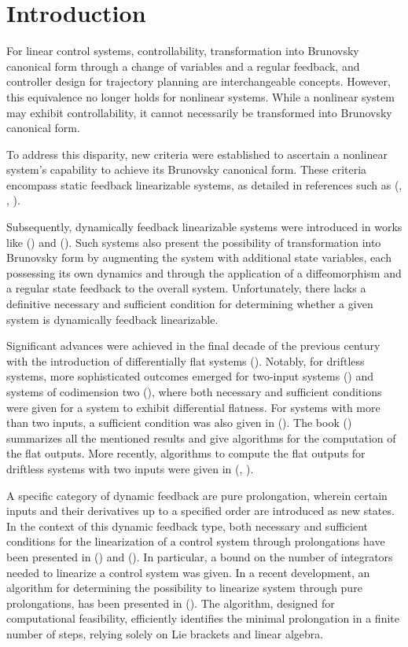 \documentclass[10pt]{article}
\newcommand{\3}{\mathbf{3}}
\newcommand{\2}{\mathbf{2}}
\newcommand{\1}{\mathbf{1}}
\newcommand{\0}{\mathbf{0}}
\begin{document}
\section{Introduction}
\label{introduction}

For linear control systems, controllability, transformation into Brunovsky canonical form through a change of variables and a regular feedback, and controller design for trajectory planning are interchangeable concepts. However, this equivalence no longer holds for nonlinear systems. While a nonlinear system may exhibit controllability, it cannot necessarily be transformed into Brunovsky canonical form.

To address this disparity, new criteria were established to ascertain a nonlinear system's capability to achieve its Brunovsky canonical form. These criteria encompass static feedback linearizable systems, as detailed in references such as (\cite{HSM}, \cite{JR}, \cite{Isidori}).

Subsequently,  dynamically feedback linearizable systems were introduced in works like (\cite{CLM89}) and (\cite{CLM91}).
Such systems also present the possibility of transformation into Brunovsky form by augmenting the system with additional state variables, each possessing its own dynamics and through the application of a diffeomorphism and a regular state feedback to the overall system.
Unfortunately, there lacks a definitive necessary and sufficient condition for determining whether a given system is dynamically feedback linearizable.

Significant advances were achieved in the final decade of the previous century with the introduction of differentially flat systems (\cite{FLMR1995}). Notably, for driftless systems, more sophisticated outcomes emerged for two-input systems (\cite{MR94}) and systems of codimension two (\cite{MR95}), where both necessary and sufficient conditions were given for a system to exhibit differential flatness. For systems with more than two inputs, a sufficient condition was also given in (\cite{MR94}). The book (\cite{Levine2009}) summarizes all the mentioned results and give algorithms for the computation of the flat outputs. More recently, algorithms to compute the flat outputs for driftless systems with two inputs were given in (\cite{LR}, \cite{Schoberl2023}).

A specific category of dynamic feedback are pure prolongation, wherein certain inputs and their derivatives up to a specified order are introduced as new states. In the context of this dynamic feedback type, both necessary and sufficient conditions for the linearization of a control system through prolongations have been presented in (\cite{tesi}) and (\cite{EJC2005}). In particular, a bound on the number of integrators needed to linearize a control system was given.
In a recent development, an algorithm for determining the possibility to linearize system through pure prolongations, has been presented in (\cite{Levine2023}). The algorithm, designed for computational feasibility, efficiently identifies the minimal prolongation in a finite number of steps, relying solely on Lie brackets and linear algebra.
\end{document}
